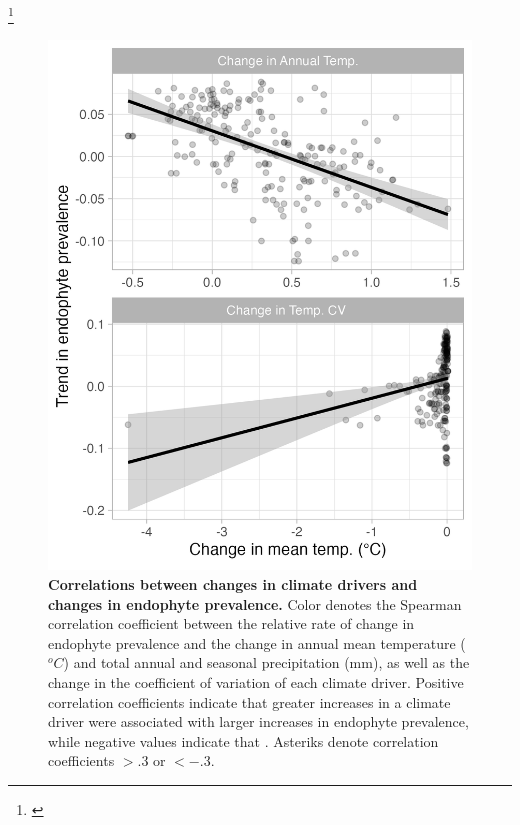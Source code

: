 \documentclass[11pt]{article}
\newcommand{\tom}[2]{{\color{red}{#1}}\footnote{\textit{\color{red}{#2}}}}
\newcommand{\josh}[2]{{\color{orange}{#1}}\footnote{\textit{\color{orange}{#2}}}}
\begin{document}
\josh{}{Only have plotted results for AGHY right now.}
\begin{figure}[H]
	\centering
	\includegraphics[width = .7\linewidth]{tmean_regression_plot_ESA.png}
	\caption{\textbf{Correlations between changes in climate drivers and changes in endophyte prevalence.} Color denotes the Spearman correlation coefficient between the relative rate of change in endophyte prevalence and the change in annual mean temperature ($^oC$) and total annual and seasonal precipitation (mm), as well as the change in the coefficient of variation of each climate driver. Positive correlation coefficients indicate that greater increases in a climate driver were associated with larger increases in endophyte prevalence, while negative values indicate that . Asteriks denote correlation coefficients $> .3$ or $< -.3$.}
\end{figure}
\end{document}
